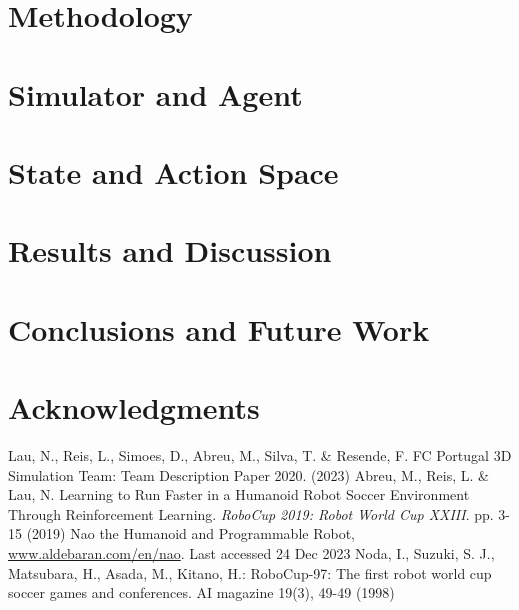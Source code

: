 \documentclass[conference]{IEEEtran}
\begin{document}
\section{Methodology}\label{Methodology}

\section{Simulator and Agent}\label{Simulator and Agent}

\section{State and Action Space}\label{State and Action Space}

\section{Results and Discussion}\label{Results and Discussion}

\section{Conclusions and Future Work}\label{Conclusions and Future Work}

\section{Acknowledgments}\label{Acknowledgments}

\begin{thebibliography}{00}
    Lau, N., Reis, L., Simoes, D., Abreu, M., Silva, T. \& Resende, F. FC Portugal 3D Simulation Team: Team Description Paper 2020.  (2023)
    Abreu, M., Reis, L. \& Lau, N. Learning to Run Faster in a Humanoid Robot Soccer Environment Through Reinforcement Learning. {\em RoboCup 2019: Robot World Cup XXIII}. pp. 3-15 (2019)
     Nao the Humanoid and Programmable Robot, \href{www.aldebaran.com/en/nao}{www.aldebaran.com/en/nao}. Last accessed 24 Dec 2023
     Noda, I., Suzuki, S. J., Matsubara, H., Asada, M., Kitano, H.: RoboCup-97: The first robot world cup soccer games and conferences. AI magazine 19(3), 49-49 (1998)
\end{thebibliography}
\end{document}
